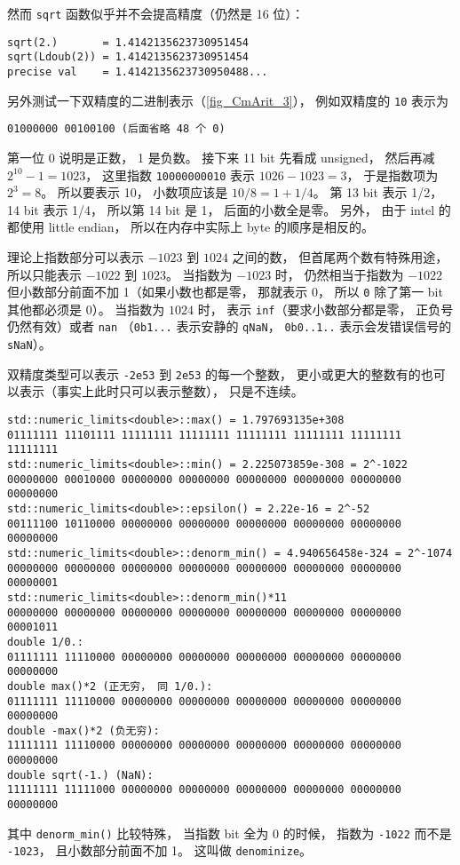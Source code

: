 然而 \verb`sqrt` 函数似乎并不会提高精度（仍然是 16 位）：
\begin{lstlisting}[language=none]
sqrt(2.)       = 1.4142135623730951454
sqrt(Ldoub(2)) = 1.4142135623730951454
precise val    = 1.4142135623730950488...
\end{lstlisting}

另外测试一下双精度的二进制表示（\autoref{fig_CmArit_3}）， 例如双精度的 \verb`10` 表示为
\begin{lstlisting}[language=none]
01000000 00100100 (后面省略 48 个 0)
\end{lstlisting}
第一位 0 说明是正数， 1 是负数。 接下来 11 bit 先看成 unsigned， 然后再减 $2^{10}-1 = 1023$， 这里指数 \verb`10000000010` 表示 $1026-1023 = 3$， 于是指数项为 $2^{3} = 8$。 所以要表示 10， 小数项应该是 $10/8 = 1+1/4$。 第 13 bit 表示 1/2， 14 bit 表示 1/4， 所以第 14 bit 是 1， 后面的小数全是零。 另外， 由于 intel 的  都使用 little endian， 所以在内存中实际上 byte 的顺序是相反的。

理论上指数部分可以表示 $-1023$ 到 $1024$ 之间的数， 但首尾两个数有特殊用途， 所以只能表示 $-1022$ 到 $1023$。 当指数为 $-1023$ 时， 仍然相当于指数为 $-1022$ 但小数部分前面不加 1（如果小数也都是零， 那就表示 0， 所以 \verb`0` 除了第一 bit 其他都必须是 0）。 当指数为 $1024$ 时， 表示 \verb`inf`（要求小数部分都是零， 正负号仍然有效）或者 \verb`nan` （\verb`0b1...` 表示安静的 \verb`qNaN`， \verb`0b0..1..` 表示会发错误信号的 \verb`sNaN`）。

双精度类型可以表示 \verb`-2e53` 到 \verb`2e53` 的每一个整数， 更小或更大的整数有的也可以表示（事实上此时只可以表示整数）， 只是不连续。

\begin{lstlisting}[language=none]
std::numeric_limits<double>::max() = 1.797693135e+308
01111111 11101111 11111111 11111111 11111111 11111111 11111111 11111111
std::numeric_limits<double>::min() = 2.225073859e-308 = 2^-1022
00000000 00010000 00000000 00000000 00000000 00000000 00000000 00000000
std::numeric_limits<double>::epsilon() = 2.22e-16 = 2^-52
00111100 10110000 00000000 00000000 00000000 00000000 00000000 00000000
std::numeric_limits<double>::denorm_min() = 4.940656458e-324 = 2^-1074
00000000 00000000 00000000 00000000 00000000 00000000 00000000 00000001
std::numeric_limits<double>::denorm_min()*11
00000000 00000000 00000000 00000000 00000000 00000000 00000000 00001011
double 1/0.:
01111111 11110000 00000000 00000000 00000000 00000000 00000000 00000000
double max()*2 (正无穷， 同 1/0.):
01111111 11110000 00000000 00000000 00000000 00000000 00000000 00000000
double -max()*2 (负无穷):
11111111 11110000 00000000 00000000 00000000 00000000 00000000 00000000
double sqrt(-1.) (NaN):
11111111 11111000 00000000 00000000 00000000 00000000 00000000 00000000
\end{lstlisting}
其中 \verb`denorm_min()` 比较特殊， 当指数 bit 全为 0 的时候， 指数为 \verb`-1022` 而不是 \verb`-1023`， 且小数部分前面不加 1。 这叫做 \verb`denominize`。


